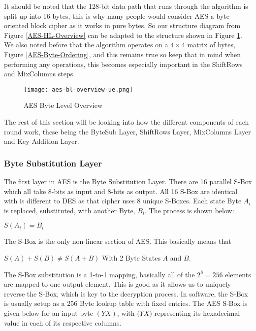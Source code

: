 It should be noted that the 128-bit data path that runs through the algorithm is split up into 16-bytes, this is why many people would consider AES a byte oriented block cipher as it works in pure bytes. So our structure diagram from Figure \ref{AES-HL-Overview} can be adapted to the structure shown in Figure \ref{AES-BL-Overview}. We also noted before that the algorithm operates on a $4\times4$ matrix of bytes, Figure \ref{AES-Byte-Ordering}, and this remains true so keep that in mind when performing any operations, this becomes especially important in the ShiftRows and MixColumns steps.

\begin{figure}[H]
\begin{center}
\texttt{[image: aes-bl-overview-ue.png]}
\end{center}
\caption{AES Byte Level Overview}
\label{AES-BL-Overview}
\end{figure}

The rest of this section will be looking into how the different components of each round work, these being the ByteSub Layer, ShiftRows Layer, MixColumns Layer and Key Addition Layer.

\subsubsection{Byte Substitution Layer}

The first layer in AES is the Byte Substitution Layer. There are 16 parallel S-Box which all take 8-bits as input and 8-bits as output. All 16 S-Box are identical with is different to DES as that cipher uses 8 unique S-Boxes. Each state Byte $A_i$ is replaced, substituted, with another Byte, $B_i$. The process is shown below:

\begin{center}
$S(A_i) = B_i$
\end{center}

The S-Box is the only non-linear section of AES. This basically means that

\begin{center}
$S(A) + S(B) \neq S(A + B)$
With 2 Byte States $A$ and $B$.
\end{center}

The S-Box substitution is a 1-to-1 mapping, basically all of the $2^8 = 256$ elements are mapped to one output element. This is good as it allows us to uniquely reverse the S-Box, which is key to the decryption process. In software, the S-Box is usually setup as a 256 Byte lookup table with fixed entries. The AES S-Box is given below for an input byte $(YX)$, with $(YX$) representing its hexadecimal value in each of its respective columns.


